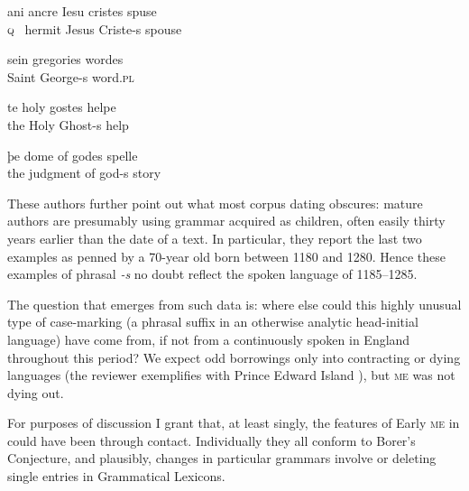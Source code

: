 \documentclass[output=paper]{LSP/langsci}
\begin{document}
\ea \label{ex:emonds:3} 

\gll ani ancre Iesu cristes spuse\\ 
   \textsc{q}~ hermit Jesus Criste-s spouse \\

\gll  sein gregories wordes\\
 Saint George-s word.\textsc{pl} \\

\gll te holy gostes helpe\\
  the Holy Ghost-s help \\

\gll þe dome of godes spelle \\
  the judgment of god-s story \\ 
  \z


  These authors further point out what most corpus dating obscures: mature authors are presumably using grammar acquired as children, often easily thirty years earlier than the date of a text. In particular, they report the last two examples as penned by a 70-year old born between 1180 and 1280. Hence these examples of phrasal \textit{{}-s} no doubt reflect the spoken language of 1185--1285. 

The {question} that emerges from such data is: where else could this highly unusual type of case-marking (a phrasal suffix in an otherwise analytic head-initial language) have come from, if not from a  continuously spoken in England throughout this period? We expect odd borrowings only into contracting or dying languages (the reviewer exemplifies with Prince Edward Island ), but \textsc{me} was not dying out.

For purposes of discussion I grant that, at least singly, the  features of Early \textsc{me} in  could have been  through contact. Individually they all conform to Borer’s Conjecture, and plausibly, changes in particular grammars involve  or deleting single entries in Grammatical Lexicons.
\end{document}
